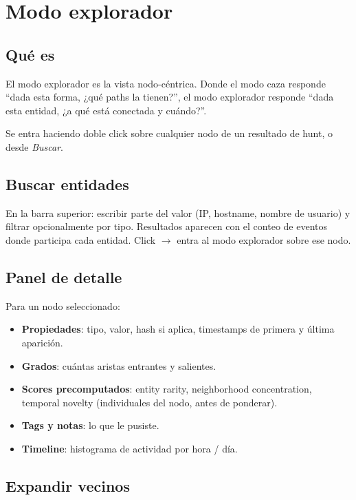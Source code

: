 \chapter{Modo explorador}
\label{sec:man-explorador}

\section{Qué es}

El modo explorador es la vista nodo-céntrica. Donde el modo caza
responde ``dada esta forma, ¿qué paths la tienen?'', el modo
explorador responde ``dada esta entidad, ¿a qué está conectada y
cuándo?''.

Se entra haciendo doble click sobre cualquier nodo de un resultado
de hunt, o desde \emph{Buscar}.

\section{Buscar entidades}

En la barra superior: escribir parte del valor (IP, hostname,
nombre de usuario) y filtrar opcionalmente por tipo. Resultados
aparecen con el conteo de eventos donde participa cada entidad.
Click $\to$ entra al modo explorador sobre ese nodo.

\section{Panel de detalle}

Para un nodo seleccionado:

\begin{itemize}
    \item \textbf{Propiedades}: tipo, valor, hash si aplica,
    timestamps de primera y última aparición.
    \item \textbf{Grados}: cuántas aristas entrantes y salientes.
    \item \textbf{Scores precomputados}: entity rarity,
    neighborhood concentration, temporal novelty (individuales del
    nodo, antes de ponderar).
    \item \textbf{Tags y notas}: lo que le pusiste.
    \item \textbf{Timeline}: histograma de actividad por hora /
    día.
\end{itemize}

\section{Expandir vecinos}

